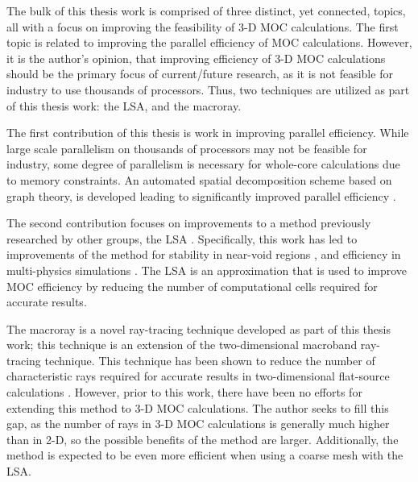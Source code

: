 {{        The bulk of this thesis work is comprised of three distinct, yet connected, topics, all with a focus on improving the feasibility of 3-D \ac{MOC} calculations.
        The first topic is related to improving the parallel efficiency of \ac{MOC} calculations.
        However, it is the author's opinion, that improving efficiency of 3-D \ac{MOC} calculations should be the primary focus of current/future research, as it is not feasible for industry to use thousands of processors.
        Thus, two techniques are utilized as part of this thesis work: the \acf{LSA}, and the macroray.

        The first contribution of this thesis is work in improving parallel efficiency.
        While large scale parallelism on thousands of processors may not be feasible for industry, some degree of parallelism is necessary for whole-core calculations due to memory constraints.
        An automated spatial decomposition scheme based on graph theory, is developed leading to significantly improved parallel efficiency \cite{Fitzgerald2017,Fitzgerald2019a}.

        The second contribution focuses on improvements to a method previously researched by other groups, the \acf{LSA} \cite{Ferrer2016,Ferrer2018,Gunow2018}.
        Specifically, this work has led to improvements of the method for stability in near-void regions \cite{Fitzgerald2018}, and efficiency in multi-physics simulations \cite{Fitzgerald2019}.
        The \ac{LSA} is an approximation that is used to improve \ac{MOC} efficiency by reducing the number of computational cells required for accurate results.

        The macroray is a novel ray-tracing technique developed as part of this thesis work; this technique is an extension of the two-dimensional macroband \cite{Villarino1992} ray-tracing technique.
        This technique has been shown to reduce the number of characteristic rays required for accurate results in two-dimensional flat-source calculations \cite{Yamamoto2005,Fevotte2007}.
        However, prior to this work, there have been no efforts for extending this method to 3-D \ac{MOC} calculations.
        The author seeks to fill this gap, as the number of rays in 3-D \ac{MOC} calculations is generally much higher than in 2-D, so the possible benefits of the method are larger.
        Additionally, the method is expected to be even more efficient when using a coarse mesh with the \ac{LSA}.
    }
}
